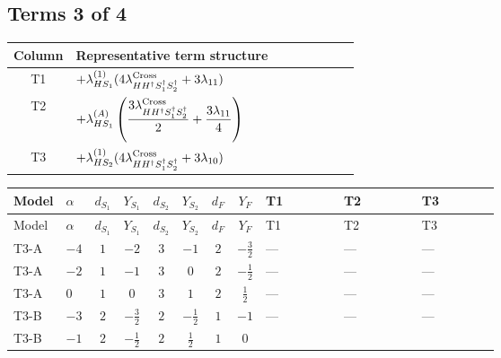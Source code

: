 \documentclass[8pt]{article}
\begin{document}
\begin{landscape}
\subsection*{Terms 3 of 4}
\begin{center}
\begin{tabular}{@{}c >{\raggedright\arraybackslash}p{0.82\linewidth}@{}}
\toprule
Column & Representative term structure \\
\midrule
T1 & \(\displaystyle +{\lambda_{HS_1}^{(1)}} (4 {\lambda_{H H^\dagger S_1^\dagger S_2^\dagger}^{\rm Cross}}+3 {\lambda_{11}})\) \\
\midrule
T2 & \(\displaystyle +{\lambda_{HS_1}^{(A)}} \left(\frac{3 {\lambda_{H H^\dagger S_1^\dagger S_2^\dagger}^{\rm Cross}}}{2}+\frac{3 {\lambda_{11}}}{4}\right)\) \\
\midrule
T3 & \(\displaystyle +{\lambda_{HS_2}^{(1)}} (4 {\lambda_{H H^\dagger S_1^\dagger S_2^\dagger}^{\rm Cross}}+3 {\lambda_{10}})\) \\
\midrule
\bottomrule
\end{tabular}
\end{center}
\smallskip
\tiny
\begin{longtable}{@{}llcccccc >{\raggedright\arraybackslash}p{0.21\linewidth} >{\raggedright\arraybackslash}p{0.21\linewidth} >{\raggedright\arraybackslash}p{0.21\linewidth}@{}}
\toprule
Model & $\alpha$ & $d_{S_1}$ & $Y_{S_1}$ & $d_{S_2}$ & $Y_{S_2}$ & $d_F$ & $Y_F$ & T1 & T2 & T3 \\
\midrule
\endfirsthead
\toprule
Model & $\alpha$ & $d_{S_1}$ & $Y_{S_1}$ & $d_{S_2}$ & $Y_{S_2}$ & $d_F$ & $Y_F$ & T1 & T2 & T3 \\
\midrule
\endhead
T3-A & $-4$ & $1$ & $-2$ & $3$ & $-1$ & $2$ & $-\frac{3}{2}$ & --- & --- & --- \\
\midrule
T3-A & $-2$ & $1$ & $-1$ & $3$ & $0$ & $2$ & $-\frac{1}{2}$ & --- & --- & --- \\
\midrule
T3-A & $0$ & $1$ & $0$ & $3$ & $1$ & $2$ & $\frac{1}{2}$ & --- & --- & --- \\
\midrule
T3-B & $-3$ & $2$ & $-\frac{3}{2}$ & $2$ & $-\frac{1}{2}$ & $1$ & $-1$ & --- & --- & --- \\
\midrule
T3-B & $-1$ & $2$ & $-\frac{1}{2}$ & $2$ & $\frac{1}{2}$ & $1$ & $0$ & \scriptsize\adjustbox{max width=\linewidth}{$\begin{gathered} +{\lambda_{HS_1}^{(1)}} (4 {\lambda_{H H^\dagger S_1^\dagger S_2^\dagger}^{\rm Cross}}+3 {\lambda_{11}})\end{gathered}$} & \scriptsize\adjustbox{max width=\linewidth}{$\begin{gathered} +{\lambda_{HS_1}^{(A)}} \left(\frac{3 {\lambda_{H H^\dagger S_1^\dagger S_2^\dagger}^{\rm Cross}}}{2}+\frac{3 {\lambda_{11}}}{4}\right)\end{gathered}$} & \scriptsize\adjustbox{max width=\linewidth}{$\begin{gathered} +{\lambda_{HS_2}^{(1)}} (4 {\lambda_{H H^\dagger S_1^\dagger S_2^\dagger}^{\rm Cross}}+3 {\lambda_{10}})\end{gathered}$} \\

\end{longtable}
\end{landscape}
\end{document}
